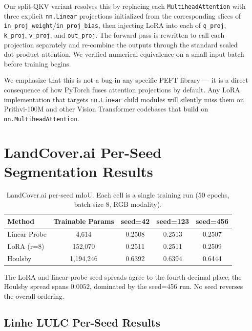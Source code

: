 Our split-QKV variant resolves this by replacing each \texttt{MultiheadAttention} with three explicit \texttt{nn.Linear} projections initialized from the corresponding slices of \texttt{in\_proj\_weight}/\texttt{in\_proj\_bias}, then injecting LoRA into each of \texttt{q\_proj}, \texttt{k\_proj}, \texttt{v\_proj}, and \texttt{out\_proj}. The forward pass is rewritten to call each projection separately and re-combine the outputs through the standard scaled dot-product attention. We verified numerical equivalence on a small input batch before training begins.

We emphasize that this is not a bug in any specific PEFT library --- it is a direct consequence of how PyTorch fuses attention projections by default. Any LoRA implementation that targets \texttt{nn.Linear} child modules will silently miss them on Prithvi-100M and other Vision Transformer codebases that build on \texttt{nn.MultiheadAttention}.

\section{LandCover.ai Per-Seed Segmentation Results}
\label{app:seg-per-seed}

\begin{table}[h]
\centering
\small
\caption{LandCover.ai per-seed mIoU. Each cell is a single training run (50 epochs, batch size 8, RGB modality).}
\label{tab:landcoverai-per-seed}
\begin{tabular}{lcccc}
\toprule
Method & Trainable Params & seed=42 & seed=123 & seed=456 \\
\midrule
Linear Probe & 4{,}614       & 0.2508 & 0.2513 & 0.2507 \\
LoRA (r=8)   & 152{,}070     & 0.2511 & 0.2511 & 0.2509 \\
Houlsby      & 1{,}194{,}246 & 0.6392 & 0.6394 & 0.6444 \\
\bottomrule
\end{tabular}
\end{table}

The LoRA and linear-probe seed spreads agree to the fourth decimal place; the Houlsby spread spans $0.0052$, dominated by the seed=456 run. No seed reverses the overall ordering.

\subsection{Linhe LULC Per-Seed Results}
\label{app:linhe-perseed}

